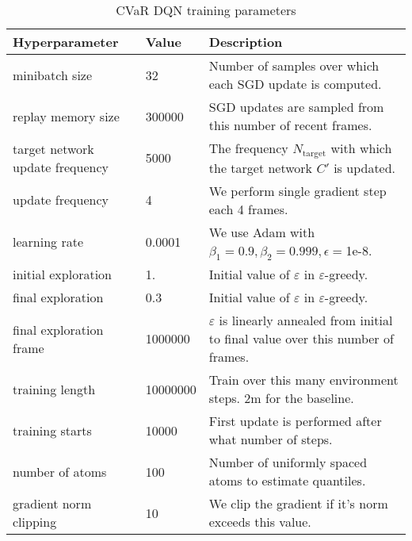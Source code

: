 \begin{table}[h]
\centering
\caption{CVaR DQN training parameters}
\label{dqnparams}
\begin{tabular}{l|l|p{7cm}}
\textbf{Hyperparameter}         & \textbf{Value} & \textbf{Description}                                                                    \\\hline
minibatch size                  & 32             & Number of samples over which each SGD update is computed.                               \\
replay memory size              & 300000         & SGD updates are sampled from this number of recent frames.                              \\
target network update frequency & 5000           & The frequency $N_{\text{target}}$ with which the target network $C'$ is updated.        \\
update frequency                & 4              & We perform single gradient step each 4 frames.                                          \\
learning rate                   & 0.0001         & We use Adam with $\beta_1=0.9, \beta_2=0.999, \epsilon=$1e-8.                           \\
initial exploration             & 1.             & Initial value of $\varepsilon$ in $\varepsilon$-greedy.                                 \\
final exploration               & 0.3            & Initial value of $\varepsilon$ in $\varepsilon$-greedy.                                 \\
final exploration frame         & 1000000        & $\varepsilon$ is linearly annealed from initial to final value over this number of frames. \\
training length			        & 10000000       & Train over this many environment steps. 2m for the baseline. 						   \\
training starts                 & 10000          & First update is performed after what number of steps.                                   \\
number of atoms                 & 100            & Number of uniformly spaced atoms to estimate quantiles.                                 \\
gradient norm clipping          & 10             & We clip the gradient if it's norm exceeds this value.                                  
\end{tabular}
\end{table}


